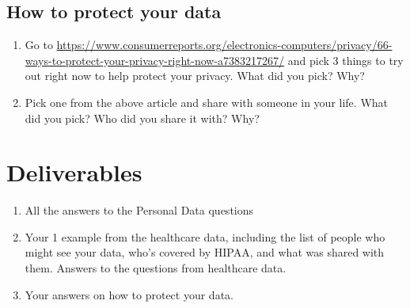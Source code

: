 \documentclass[12pt]{article}
\begin{document}
\subsection*{How to protect your data}
\begin{enumerate}
    \item Go to \url{https://www.consumerreports.org/electronics-computers/privacy/66-ways-to-protect-your-privacy-right-now-a7383217267/} and pick 3 things to try out right now to help protect your privacy.  What did you pick? Why?
    \item Pick one from the above article and share with someone in your life.  What did you pick? Who did you share it with? Why?
\end{enumerate}

\section*{Deliverables}

\begin{enumerate}
    \item All the answers to the Personal Data questions
    \item Your 1 example from the healthcare data, including the list of people who might see your data, who's covered by HIPAA, and what was shared with them. Answers to the questions from healthcare data.
    \item Your answers on how to protect your data. 

\end{enumerate}
\end{document}
